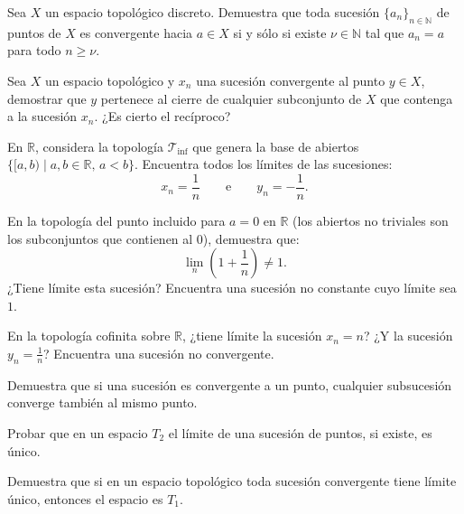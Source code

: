 \begin{ejer}[63]
Sea $X$ un espacio topológico discreto. Demuestra que toda sucesión $\{a_n\}_{n \in \mathbb{N}}$ de puntos de $X$ es convergente hacia $a \in X$ si y sólo si existe $\nu \in \mathbb{N}$ tal que $a_n = a$ para todo $n \ge \nu$.
\end{ejer}

\begin{ejer}[64]
Sea $X$ un espacio topológico y $x_n$ una sucesión convergente al punto $y \in X$, demostrar que $y$ pertenece al cierre de cualquier subconjunto de $X$ que contenga a la sucesión $x_n$. ¿Es cierto el recíproco?
\end{ejer}

\begin{ejer}[65]
En $\mathbb{R}$, considera la topología $\mathcal{T}_{\mathrm{inf}}$ que genera la base de abiertos $\{[a,b) \mid a,b \in \mathbb{R}, \, a < b\}$. Encuentra todos los límites de las sucesiones:
\[
    x_n = \frac{1}{n} \qquad \text{e} \qquad y_n = -\frac{1}{n}.
\]
\end{ejer}

\begin{ejer}[66]
En la topología del punto incluido para $a = 0$ en $\mathbb{R}$ (los abiertos no triviales son los subconjuntos que contienen al $0$), demuestra que:
\[
    \lim_n \left(1 + \frac{1}{n}\right) \neq 1.
\]
¿Tiene límite esta sucesión? Encuentra una sucesión no constante cuyo límite sea $1$.
\end{ejer}

\begin{ejer}[67]
En la topología cofinita sobre $\mathbb{R}$, ¿tiene límite la sucesión $x_n = n$? ¿Y la sucesión $y_n = \frac{1}{n}$? Encuentra una sucesión no convergente.
\end{ejer}

\begin{ejer}[68]
Demuestra que si una sucesión es convergente a un punto, cualquier subsucesión converge también al mismo punto.
\end{ejer}

\begin{ejer}[69]
Probar que en un espacio $T_2$ el límite de una sucesión de puntos, si existe, es único.
\end{ejer}

\begin{ejer}[70]
Demuestra que si en un espacio topológico toda sucesión convergente tiene límite único, entonces el espacio es $T_1$.
\end{ejer}

